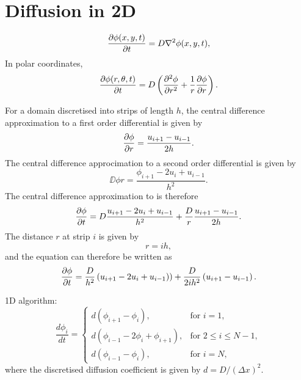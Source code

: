\section{Diffusion in 2D}

\cite{Kunz2011}


%
\begin{equation}
  \frac{\partial \phi(x,y,t)}{\partial t} = D \nabla^2 \phi(x,y,t) ,
  \label{eqn:diffusion_cartesian}
\end{equation}
%
In polar coordinates,
\begin{equation}
\frac{\partial \phi(r,\theta,t)}{\partial t} = D \left(\frac{\partial^2 \phi}{\partial r^2} + \frac{1}{r}\frac{\partial \phi}{\partial r} \right).
\label{eqn:diffusion_polar}
\end{equation}

For a domain discretised into strips of length $h$, the central difference approximation to a first order differential is given by
\begin{equation}
\frac{\partial \phi}{\partial r} = \frac{u_{i+1}-u_{i-1}}{2 h} .
\end{equation}
%
The central difference approcimation to a second order differential is given by
\begin{equation}
\DD{\phi}{r} = \frac{\phi_{i+1}-2u_i+u_{i-1}}{h^2} .
\end{equation}
%
The central difference approximation to  is therefore
%
\begin{equation}
\frac{\partial \phi}{\partial t} = D\frac{u_{i+1}-2u_i + u_{i-1}}{h^2} + \frac{D}{r} \frac{u_{i+1}-u_{i-1}}{2 h} .
\end{equation}
%
The distance $r$ at strip $i$ is given by
\begin{equation}
r = i h ,
\end{equation}
%
and the equation can therefore be written as
%
\begin{equation}
\frac{\partial \phi}{\partial t} = \frac{D}{h^2} \left(u_{i+1}-2u_i + u_{i-1}) \right) + \frac{D}{2ih^2}\left(u_{i+1}-u_{i-1} \right).
\end{equation}


1D algorithm:
%
\begin{equation}
\frac{d\phi_i}{dt} = \begin{cases}
		d(\phi_{i+1} - \phi_{i}), & \text{for } i = 1, \\
		d(\phi_{i-1}-2\phi_i +\phi_{i+1}), & \text{for } 2 \leq i \leq N-1, \\
		d(\phi_{i-1}-\phi_i), & \text{for } i = N ,
		\end{cases}
        \label{eqn:discrete_diffusion}
\end{equation}
%
where the discretised diffusion coefficient is given by
$d = D/(\Delta x)^2$.

